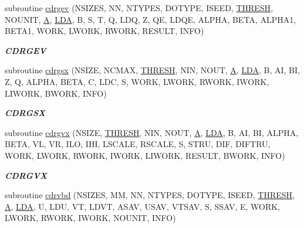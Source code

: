 \begin{DoxyCompactItemize}
subroutine \hyperlink{group__complex__eig_gac1ee1e6b74cbcaedfebbee8b8784c2a2}{cdrgev} (N\+S\+I\+Z\+E\+S, N\+N, N\+T\+Y\+P\+E\+S, D\+O\+T\+Y\+P\+E, I\+S\+E\+E\+D, \hyperlink{zlaqgs_8c_a0656018abfc9fa2821827415f5d5ea57}{T\+H\+R\+E\+S\+H}, N\+O\+U\+N\+I\+T, \hyperlink{classA}{A}, \hyperlink{example__user_8c_ae946da542ce0db94dced19b2ecefd1aa}{L\+D\+A}, B, S, T, Q, L\+D\+Q, Z, Q\+E, L\+D\+Q\+E, A\+L\+P\+H\+A, B\+E\+T\+A, A\+L\+P\+H\+A1, B\+E\+T\+A1, W\+O\+R\+K, L\+W\+O\+R\+K, R\+W\+O\+R\+K, R\+E\+S\+U\+L\+T, I\+N\+F\+O)
\begin{DoxyCompactList}\small\item\em {\bfseries C\+D\+R\+G\+E\+V} \end{DoxyCompactList}\item 
subroutine \hyperlink{group__complex__eig_ga21eb09898bd5e7259abc7e07868c3687}{cdrgsx} (N\+S\+I\+Z\+E, N\+C\+M\+A\+X, \hyperlink{zlaqgs_8c_a0656018abfc9fa2821827415f5d5ea57}{T\+H\+R\+E\+S\+H}, N\+I\+N, N\+O\+U\+T, \hyperlink{classA}{A}, \hyperlink{example__user_8c_ae946da542ce0db94dced19b2ecefd1aa}{L\+D\+A}, B, A\+I, B\+I, Z, Q, A\+L\+P\+H\+A, B\+E\+T\+A, C, L\+D\+C, S, W\+O\+R\+K, L\+W\+O\+R\+K, R\+W\+O\+R\+K, I\+W\+O\+R\+K, L\+I\+W\+O\+R\+K, B\+W\+O\+R\+K, I\+N\+F\+O)
\begin{DoxyCompactList}\small\item\em {\bfseries C\+D\+R\+G\+S\+X} \end{DoxyCompactList}\item 
subroutine \hyperlink{group__complex__eig_gac4baee2f642cf143c6b713d3f12e56bf}{cdrgvx} (N\+S\+I\+Z\+E, \hyperlink{zlaqgs_8c_a0656018abfc9fa2821827415f5d5ea57}{T\+H\+R\+E\+S\+H}, N\+I\+N, N\+O\+U\+T, \hyperlink{classA}{A}, \hyperlink{example__user_8c_ae946da542ce0db94dced19b2ecefd1aa}{L\+D\+A}, B, A\+I, B\+I, A\+L\+P\+H\+A, B\+E\+T\+A, V\+L, V\+R, I\+L\+O, I\+H\+I, L\+S\+C\+A\+L\+E, R\+S\+C\+A\+L\+E, S, S\+T\+R\+U, D\+I\+F, D\+I\+F\+T\+R\+U, W\+O\+R\+K, L\+W\+O\+R\+K, R\+W\+O\+R\+K, I\+W\+O\+R\+K, L\+I\+W\+O\+R\+K, R\+E\+S\+U\+L\+T, B\+W\+O\+R\+K, I\+N\+F\+O)
\begin{DoxyCompactList}\small\item\em {\bfseries C\+D\+R\+G\+V\+X} \end{DoxyCompactList}\item 
subroutine \hyperlink{group__complex__eig_ga2b82bbab7031b4a887831d1cf3d3ac42}{cdrvbd} (N\+S\+I\+Z\+E\+S, M\+M, N\+N, N\+T\+Y\+P\+E\+S, D\+O\+T\+Y\+P\+E, I\+S\+E\+E\+D, \hyperlink{zlaqgs_8c_a0656018abfc9fa2821827415f5d5ea57}{T\+H\+R\+E\+S\+H}, \hyperlink{classA}{A}, \hyperlink{example__user_8c_ae946da542ce0db94dced19b2ecefd1aa}{L\+D\+A}, U, L\+D\+U, V\+T, L\+D\+V\+T, A\+S\+A\+V, U\+S\+A\+V, V\+T\+S\+A\+V, S, S\+S\+A\+V, E, W\+O\+R\+K, L\+W\+O\+R\+K, R\+W\+O\+R\+K, I\+W\+O\+R\+K, N\+O\+U\+N\+I\+T, I\+N\+F\+O)

\end{DoxyCompactItemize}
